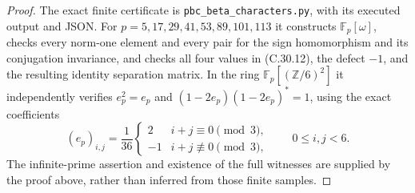 \begin{proof}
The exact finite certificate is
\texttt{pbc\_beta\_characters.py}, with its executed output and JSON.
For $p=5,17,29,41,53,89,101,113$ it constructs
$\mathbb F_p[\omega]$, checks every norm-one element and every pair
for the sign homomorphism and its conjugation invariance, and checks
all four values in (C.30.12), the defect $-1$, and the resulting
identity separation matrix. In the ring
$\mathbb F_p[(\mathbb Z/6)^2]$ it independently verifies
$e_p^2=e_p$ and $(1-2e_p)(1-2e_p)^*=1$, using the exact coefficients
\[
 (e_p)_{i,j}=\frac1{36}
 \begin{cases}2&i+j\equiv0\pmod3,\\-1&i+j\not\equiv0\pmod3,
 \end{cases}
 \qquad 0\leq i,j<6.
 \tag{C.30.14}
\]
The infinite-prime assertion and existence of the full witnesses
are supplied by the proof above, rather than inferred from those
finite samples.
\end{proof}


